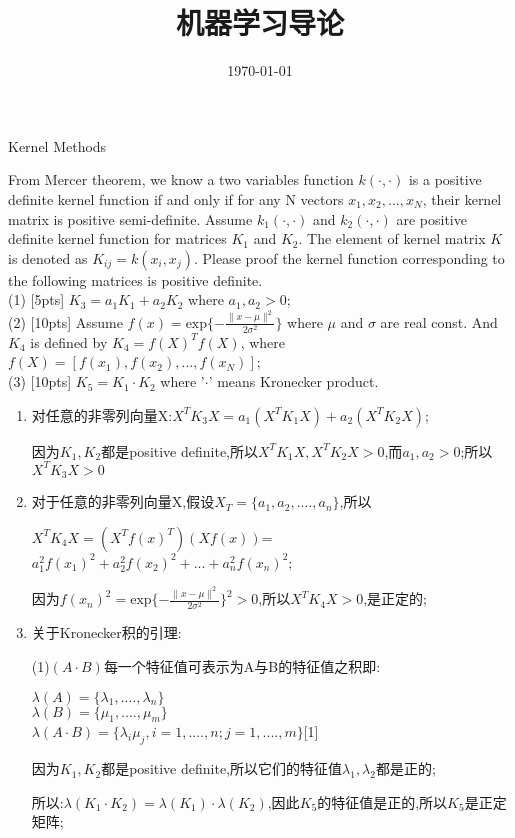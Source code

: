 \documentclass[11pt, a4paper, UTF8]{ctexart}
\title{机器学习导论}
\date{\today}
\begin{document}
                                                                                                                
\noplagiarism

\beginthishw
\begin{problem}[ML problem 1]
	[25pts] Kernel Methods
	
From Mercer theorem, we know a two variables function $k(\cdot,\cdot)$ is a positive definite kernel function if and only if for any N vectors $x_1,x_2,...,x_N$, their kernel matrix is positive semi-definite. Assume $k_1(\cdot,\cdot)$ and $k_2(\cdot,\cdot)$ are positive definite kernel function for matrices $K_1$ and $K_2$. The element of kernel matrix $K$ is denoted as $K_{ij}=k(x_i,x_j)$. Please proof the kernel function corresponding to the following matrices is positive definite.\\
(1) [5pts] $K_3=a_1 K_1+a_2 K_2$ where $a_1,a_2>0$;\\
(2) [10pts] Assume $f(x)=\text{exp}\{-\frac{\|x-\mu\|^2}{2\sigma^2}\}$ where $\mu$ and $\sigma$ are real const. And $K_4$ is defined by $K_4=f(X)^T f(X)$, where $f(X)=[f(x_1),f(x_2),...,f(x_N)]$;\\
(3) [10pts] $K_5=K_1\cdot K_2$ where '$\cdot$' means Kronecker product.\\





\end{problem}
\begin{solution}
\begin{enumerate}
	\item 对任意的非零列向量X:$X^TK_3X=a_1(X^TK_1X)+a_2(X^TK_2X)$;
	
	因为$K_1,K_2$都是positive definite,所以$X^TK_1X,X^TK_2X>0$,而$a_1,a_2>0$;所以$X^TK_3X>0$
	\item 对于任意的非零列向量X,假设$X_T=\{a_1,a_2,....,a_n\}$,所以
	
	$X^TK_4X=(X^Tf(x)^T)(Xf(x))$=$a_1^2f(x_1)^2+a_2^2f(x_2)^2+...+a_n^2f(x_n)^2$;
	
	因为$f(x_n)^2=\text{exp}\{-\frac{\|x-\mu\|^2}{2\sigma^2}\}^2>0$,所以$X^TK_4X>0$,是正定的;
	\item 关于Kronecker积的引理:
	
	(1)$(A\cdot B)$每一个特征值可表示为A与B的特征值之积即:
	
	$\lambda (A)=\{\lambda_1,....,\lambda_n\}$
	\\$\lambda (B)=\{\mu_1,....,\mu_m\}$
	\\$\lambda(A\cdot B)=\{\lambda_i\mu_j,i=1,....,n;j=1,....,m\}$[1]
	
	因为$K_1,K_2$都是positive definite,所以它们的特征值$\lambda_1,\lambda_2$都是正的;
	
	所以:$\lambda(K_1\cdot K_2)=\lambda(K_1)\cdot \lambda(K_2)$,因此$K_5$的特征值是正的,所以$K_5$是正定矩阵;
\end{enumerate}
    
\end{solution}
\end{document}
